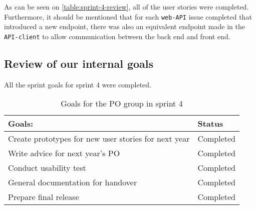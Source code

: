 \noindent
As can be seen on \autoref{table:sprint-4-review}, all of the user stories were completed. Furthermore, it should be mentioned that for each \texttt{web-API} issue completed that introduced a new endpoint, there was also an equivalent endpoint made in the \texttt{API-client} to allow communication between the back end and front end.

\subsection{Review of our internal goals}
All the sprint goals for sprint 4 were completed.
\begin{table}[H]
    \centering
    \begin{tabular}{|l|l|}
    \hline
    Goals:  & Status \\ \hline
     Create prototypes for new user stories for next year & Completed\\ \hline
     Write advice for next year's PO  & Completed  \\ \hline
     Conduct usability test & Completed  \\ \hline
     General documentation for handover & Completed \\ \hline
     Prepare final release & Completed  \\ \hline
    \end{tabular}
    \caption{Goals for the PO group in sprint 4}
\end{table}


